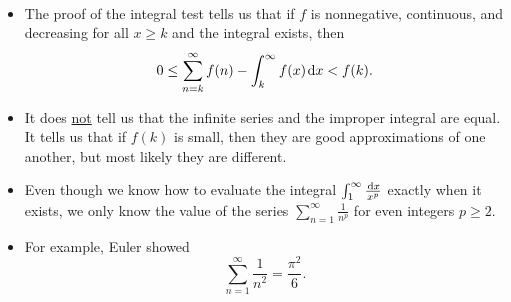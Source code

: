 \begin{remark}\,
\begin{itemize}
\item The proof of the integral test tells us that if $f$ is nonnegative, continuous, and decreasing for all $x\ge k$ and the integral exists, then
\begin{equation*}
0\le \sum_{n=k}^\infty f(n) - \int_k^\infty f(x)\mkern 2mu \mathrm{d} x < f(k).
\end{equation*}
\item It does \underline{not} tell us that the infinite series and the improper integral are equal.  
It tells us that if $f(k)$ is small, then they are good approximations of one another, but most likely they are different.
\item Even though we know how to evaluate the integral $\int_1^\infty\frac{\mkern 2mu \mathrm{d} x}{x^p}$ exactly when it exists,
we only know the value of the series $\sum_{n=1}^\infty\frac{1}{n^p}$ for even integers $p\ge 2$.
\item For example, Euler showed
\begin{equation*}
\sum_{n=1}^\infty\frac{1}{n^2} = \frac{\pi^2}{6}.
\end{equation*}
\end{itemize}
\end{remark}

\newpage

